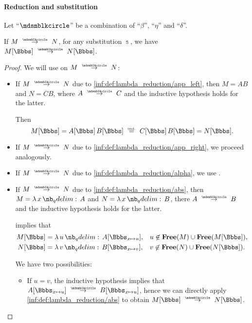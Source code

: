 \paragraph{Reduction and substitution}

\begin{proposition}\label{thm:substitution_on_single_step_reduction}
  Let \enquote{\( {\Anon} \)} be a combination of \enquote{\( \beta \)}, \enquote{\( \eta \)} and \enquote{\( \delta \)}.

  If \( M \pred N \), for any substitution \( \Bbbs \), we have \( M[\Bbbs] \pred N[\Bbbs] \).
\end{proposition}
\begin{proof}
  We will use  on \( M \pred N \):
  \begin{itemize}
    \item If \( M \pred N \) due to \ref{inf:def:lambda_reduction/app_left}, then \( M = AB \) and \( N = CB \), where \( A \pred C \) and the inductive hypothesis holds for the latter.

    Then
    \begin{equation*}
      M[\Bbbs]
      =
      A[\Bbbs] \thinspace B[\Bbbs]
      \reloset{\T{ind.}} =
      C[\Bbbs] \thinspace B[\Bbbs]
      =
      N[\Bbbs].
    \end{equation*}

    \item If \( M \pred N \) due to \ref{inf:def:lambda_reduction/app_right}, we proceed analogously.

    \item If \( M \pred N \) due to \ref{inf:def:lambda_reduction/alpha}, we use .

    \item If \( M \pred N \) due to \ref{inf:def:lambda_reduction/abs}, then \( M = \qabs x A \) and \( N = \qabs x B \), there \( A \pred B \) and the inductive hypothesis holds for the latter.

     implies that
    \begin{align*}
      M[\Bbbs] &= \qabs u A[\Bbbs_{x \mapsto u}], &&u \not\in \op*{Free}(M) \cup \op*{Free}(M[\Bbbs]), \\
      N[\Bbbs] &= \qabs v B[\Bbbs_{x \mapsto v}], &&v \not\in \op*{Free}(N) \cup \op*{Free}(N[\Bbbs]).
    \end{align*}

    We have two possibilities:
    \begin{itemize}
      \item If \( u = v \), the inductive hypothesis implies that \( A[\Bbbs_{x \mapsto u}] \pred B[\Bbbs_{x \mapsto u}] \), hence we can directly apply \ref{inf:def:lambda_reduction/abs} to obtain \( M[\Bbbs] \pred N[\Bbbs] \).


\end{itemize}
\end{itemize}
\end{proof}
